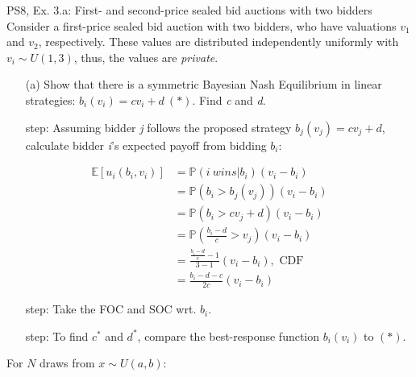 \begin{frame}{PS8, Ex. 3.a: First- and second-price sealed bid auctions with two bidders}
    Consider a first-price sealed bid auction with two bidders, who have valuations $v_1$ and $v_2$, respectively. These values are distributed independently uniformly with $v_i\sim U(1,3)$, thus, the values are \textit{private}.
    \vspace{-4pt}
    \begin{itemize}
      \item[(a)] Show that there is a symmetric Bayesian Nash Equilibrium in linear strategies: $b_i(v_i) = cv_i + d\ (*)$. Find \textit{c} and \textit{d}.
    \end{itemize}
    \vspace{-8pt}
    \begin{multicols}{2}
      \begin{itemize}
        \item[\nth{1} step:] Assuming bidder \textit{j} follows the proposed strategy $b_j(v_j) = cv_j + d$, calculate bidder \textit{i}'s expected payoff from bidding $b_i$:
      \end{itemize}
      \vspace{-12pt}
      \begin{align*}
        \mathbb{E}[u_i(b_i,v_i)]&=\mathbb{P}(i\ wins|b_i)(v_i-b_i)\\
                                &=\mathbb{P}(b_i>b_j(v_j))(v_i-b_i)\\
                                &=\mathbb{P}(b_i>cv_j+d)(v_i-b_i)\\
                                &=\mathbb{P}\left(\frac{b_i-d}{c}>v_j\right)(v_i-b_i)\\
                                &=\frac{\frac{b_i-d}{c}-1}{3-1}(v_i-b_i),\text{ CDF}\\
                                &=\frac{b_i-d-c}{2c}(v_i-b_i)
      \end{align*}
      \vspace{-18pt}
      \begin{itemize}
        \item[\nth{2} step:] Take the FOC and SOC wrt. $b_i$.
        \item[\nth{3} step:] To find $c^*$ and $d^*$, compare the best-response function $b_i(v_i)$ to $(*)$.
      \end{itemize}
      \vfill\null\columnbreak
      For $N$ draws from $x\sim U(a, b):$
      \vspace{-6pt}
      \begin{enumerate}

\end{enumerate}
\end{multicols}
\end{frame}
